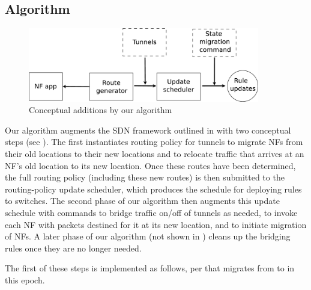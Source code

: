 \subsection{Algorithm}
\label{sec:migration:algo}

\begin{figure}[t]
\centering
\includegraphics[width=0.9\textwidth]{algorithm.eps}
\caption{Conceptual additions by our algorithm}
\label{fig:algorithm}
\vspace{-0.3cm}
\end{figure}

Our algorithm augments the SDN framework outlined in
 with two conceptual steps (see
).  The first instantiates routing policy for
tunnels to migrate NFs from their old locations to their new locations
and to relocate traffic that arrives at an NF's old location to its
new location.  Once these routes have been determined, the full
routing policy (including these new routes) is then submitted to the
routing-policy update scheduler, which produces the schedule for
deploying rules to switches.  The second phase of our algorithm then
augments this update schedule with commands to bridge traffic on/off
of tunnels as needed, to invoke each NF with packets destined for it
at its new location, and to initiate migration of NFs.  A later phase
of our algorithm (not shown in ) cleans up the
bridging rules once they are no longer needed.



The first of these steps is implemented as follows, per \nfID{\nfIdx}
that migrates from \oldSwitchID{\nfIdx} to \newSwitchID{\nfIdx} in
this epoch.

\hspace*{-\parindent}

